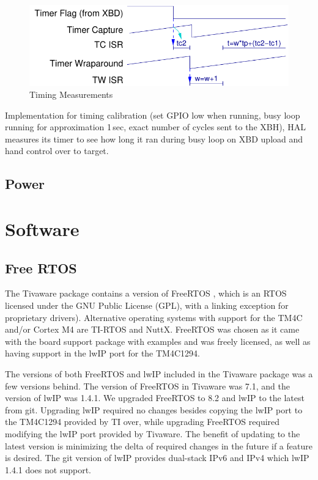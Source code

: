 \documentclass[twoside,11pt]{cergdoc}
\begin{document}
\begin{figure}[ht]
  \begin{center}
    \includegraphics[scale=0.8]{figures/timing}
    \caption{Timing Measurements}\label{fig:timing}
  \end{center}
\end{figure}

Implementation for timing calibration (set GPIO low when running,
busy loop running for approximation 1\,sec,
exact number of cycles sent to the XBH), HAL
measures its timer to see how long it ran
during busy loop on XBD upload and hand
control over to target.

  \section{Power}



\chapter{Software}
  \section{Free RTOS}
The Tivaware package contains a version of FreeRTOS \cite{freertos}, which is an
RTOS licensed under the GNU Public License (GPL), with a linking exception for
proprietary drivers).  Alternative operating systems with support for the TM4C
and/or Cortex M4 are TI-RTOS and NuttX. FreeRTOS was chosen as it came with
the board support package with examples and was freely licensed, as well as
having support in the lwIP port for the TM4C1294.

The versions of both FreeRTOS and lwIP included in the Tivaware package was a
few versions behind. The version of FreeRTOS in Tivaware was 7.1, and the
version of lwIP was 1.4.1. We upgraded FreeRTOS to 8.2 and lwIP to the latest
from git. Upgrading lwIP required no changes besides copying the lwIP
port to the TM4C1294 provided by TI over, while upgrading FreeRTOS required
modifying the lwIP port provided by Tivaware. The benefit of updating to the
latest version is minimizing the delta of required changes in the future if a
feature is desired. The git version of lwIP provides dual-stack IPv6 and IPv4
which lwIP 1.4.1 does not support.
\end{document}
